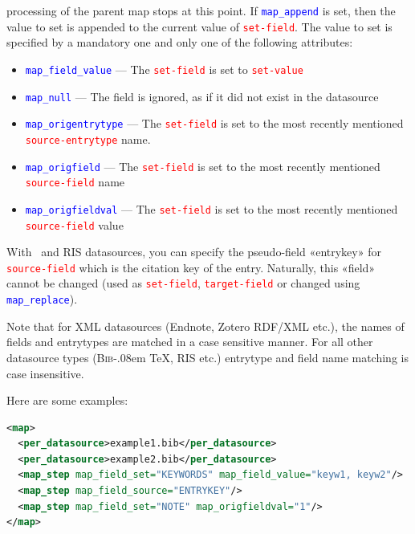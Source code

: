 \documentclass{ltxdockit}
\def\BibTeX{\textsc{Bib}\kern-.08em \TeX}
\begin{document}
\begin{itemize}
  processing of the parent map stops at this point. If
  \textcolor{blue}{\texttt{map\_append}} is set, then the value to set is
  appended to the current value of \textcolor{red}{\texttt{set-field}}. The
  value to set is specified by a mandatory one and only one of the
  following attributes:
  \begin{itemize}
    \item \textcolor{blue}{\texttt{map\_field\_value}} --- The
      \textcolor{red}{\texttt{set-field}} is set to
      \textcolor{red}{\texttt{set-value}}
    \item \textcolor{blue}{\texttt{map\_null}} --- The field is ignored, as
      if it did not exist in the datasource
    \item \textcolor{blue}{\texttt{map\_origentrytype}} --- The
      \textcolor{red}{\texttt{set-field}} is set to the
      most recently mentioned \textcolor{red}{\texttt{source-entrytype}} name.
    \item \textcolor{blue}{\texttt{map\_origfield}} --- The
      \textcolor{red}{\texttt{set-field}} is set to the most recently
      mentioned \textcolor{red}{\texttt{source-field}} name
    \item \textcolor{blue}{\texttt{map\_origfieldval}} --- The
      \textcolor{red}{\texttt{set-field}} is set to the most recently
      mentioned \textcolor{red}{\texttt{source-field}} value
  \end{itemize}
\end{itemize}

\noindent With \bibtex\ and RIS datasources, you can specify the
pseudo-field «entrykey» for \textcolor{red}{\texttt{source-field}}
which is the citation key of the entry. Naturally, this «field» cannot
be changed (used as \textcolor{red}{\texttt{set-field}},
\textcolor{red}{\texttt{target-field}} or changed using
\textcolor{blue}{\texttt{map\_replace}}).

Note that for XML datasources (Endnote, Zotero RDF/XML etc.), the names of
fields and entrytypes are matched in a case sensitive manner. For all other
datasource types (\BibTeX, RIS etc.) entrytype and field name matching is
case insensitive.

\noindent Here are some examples:

\begin{lstlisting}[language=xml,escapechar=+,mathescape=true]
<map>
  <per_datasource>example1.bib</per_datasource>
  <per_datasource>example2.bib</per_datasource>
  <map_step map_field_set="KEYWORDS" map_field_value="keyw1, keyw2"/>
  <map_step map_field_source="ENTRYKEY"/>
  <map_step map_field_set="NOTE" map_origfieldval="1"/>
</map>
\end{lstlisting}
\end{document}

